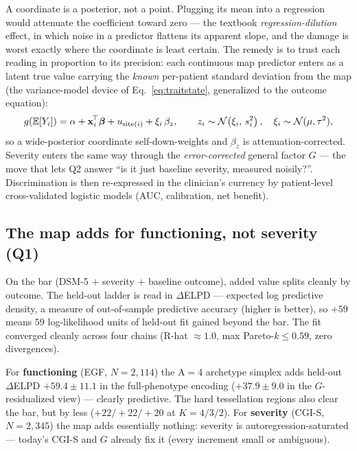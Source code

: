 \begin{methodsbox}
A coordinate is a posterior, not a point. Plugging its mean into a regression would attenuate the
coefficient toward zero --- the textbook \emph{regression-dilution} effect, in which noise in a predictor
flattens its apparent slope, and the damage is worst exactly where the coordinate is least certain. The
remedy is to trust each reading in proportion to its precision: each continuous map predictor enters as a
latent true value carrying the \emph{known} per-patient standard deviation from the map (the variance-model
device of Eq.~\ref{eq:traitstate}, generalized to the outcome equation):
\begin{equation}
\label{eq:eiv}
g\!\left(\mathbb{E}[Y_{i}]\right)=\alpha+\mathbf{x}_i^{\!\top}\bm\beta+u_{\mathrm{site}(i)}+\xi_i\,\beta_{z},
\qquad z_{i}\sim\mathcal{N}\!\left(\xi_i,\,s^2_{i}\right),\quad \xi_i\sim\mathcal{N}(\mu,\tau^2),
\end{equation}
so a wide-posterior coordinate self-down-weights and $\beta_z$ is attenuation-corrected. Severity enters
the same way through the \emph{error-corrected} general factor $G$ --- the move that lets Q2 answer ``is
it just baseline severity, measured noisily?''. Discrimination is then re-expressed in the clinician's
currency by patient-level cross-validated logistic models (AUC, calibration, net benefit).
\end{methodsbox}

\subsection{The map adds for functioning, not severity (Q1)}
On the bar (DSM-5 $+$ severity $+$ baseline outcome), added value splits cleanly by outcome. The held-out
ladder is read in $\Delta$ELPD --- expected log predictive density, a measure of out-of-sample predictive
accuracy (higher is better), so $+59$ means $59$ log-likelihood units of held-out fit gained beyond the
bar. The fit converged cleanly across four chains (R-hat $\approx 1.0$, max Pareto-$k\le 0.59$, zero
divergences).

\begin{keyresult}
For \textbf{functioning} (EGF, $N=2{,}114$) the A$=$4 archetype simplex adds held-out $\Delta$ELPD
$\mathbf{+59.4\pm11.1}$ in the full-phenotype encoding ($+37.9\pm9.0$ in the $G$-residualized view) --- clearly
predictive. The hard tessellation regions also clear the bar, but by less ($+22/+22/+20$ at $K=4/3/2$). For
\textbf{severity} (CGI-S, $N=2{,}345$) the map adds essentially nothing: severity is
autoregression-saturated --- today's CGI-S and $G$ already fix it (every increment small or ambiguous).
\end{keyresult}

